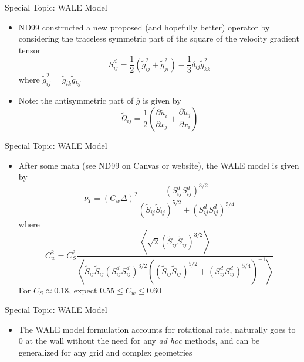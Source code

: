\begin{frame}{Special Topic: WALE Model}
\begin{itemize}
	\item ND99 constructed a new proposed (and hopefully better) operator by considering the traceless symmetric part of the square of the velocity gradient tensor
	$$S_{ij}^d = \frac{1}{2}\left(\widetilde{g}^2_{ij} + \widetilde{g}^2_{ji}\right) - \frac{1}{3}\delta_{ij} \widetilde{g}^2_{kk}$$
	where $\widetilde{g}^2_{ij} = \widetilde{g}_{ik}\widetilde{g}_{kj}$
	\item Note: the antisymmetric part of $\overline{g}$ is given by
	$$\widetilde{\Omega}_{ij} = \frac{1}{2} \left( \frac{\partial \widetilde{u}_i}{\partial x_j} + \frac{\partial \widetilde{u}_j}{\partial x_i}\right)$$
\end{itemize}
\end{frame}
\begin{frame}{Special Topic: WALE Model}
\begin{itemize}
	\item After some math (see ND99 on Canvas or website), the WALE model is given by
	$$\nu_T = (C_w\Delta)^2 \frac{ \left( S_{ij}^d S_{ij}^d \right)^{3/2}}{\left( \widetilde{S}_{ij} \widetilde{S}_{ij} \right)^{5/2} + \left( S_{ij}^d S_{ij}^d \right)^{5/4}}$$
	where
	$$C_w^2 = C_S^2 \frac{ \left\langle \sqrt{2}\left(\widetilde{S}_{ij} \widetilde{S}_{ij}\right)^{3/2}\right\rangle}{ \left\langle \widetilde{S}_{ij} \widetilde{S}_{ij} \left( S_{ij}^d S_{ij}^d \right)^{3/2} \left( \left( \widetilde{S}_{ij} \widetilde{S}_{ij} \right)^{5/2} + \left( S_{ij}^d S_{ij}^d \right)^{5/4} \right)^{-1} \right\rangle}$$
	For $C_S\approx0.18$, expect $0.55 \leq C_w \leq 0.60$ 
\end{itemize}
\end{frame}
\begin{frame}{Special Topic: WALE Model}
\begin{itemize}
	\item The WALE model formulation accounts for rotational rate, naturally goes to 0 at the wall without the need for any \textit{ad hoc} methods, and can be generalized for any grid and complex geometries
\end{itemize}
\end{frame}
